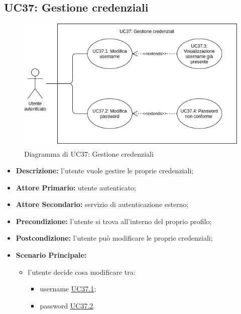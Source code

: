 \subsection{UC37: Gestione credenziali}
\label{sec:UC37}
\begin{figure}[!ht]
    \caption{Diagramma di UC37: Gestione credenziali}
    \vspace{10px}
    \includegraphics[scale=0.5]{../../../Images/AnalisiRequisiti/UC37}
    \centering
\end{figure}

\begin{itemize}
    \item \textbf{Descrizione:} l'utente vuole gestire le proprie credenziali;
    \item \textbf{Attore Primario:} utente autenticato;
    \item \textbf{Attore Secondario:} servizio di autenticazione esterno;
    \item \textbf{Precondizione:} l'utente si trova all'interno del proprio profilo;
    \item \textbf{Postcondizione:} l'utente può modificare le proprie credenziali;
    \item \textbf{Scenario Principale:}
          \begin{itemize}
              \item  l'utente decide cosa modificare tra:
                    \begin{itemize}
                        \item username \underline{\hyperref[sec:UC37.1]{UC37.1}};
                        \item password  \underline{\hyperref[sec:UC37.2]{UC37.2}}.
                    \end{itemize}
          \end{itemize}
\end{itemize}

